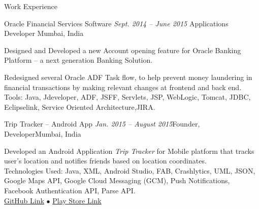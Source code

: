 \documentclass{resume} %
\begin{document}

\begin{rSection}{Work Experience}

\begin{rSubsection}{Oracle Financial Services Software} {\emph{Sept. 2014 -- June 2015}} {Applications Developer}
{Mumbai, India}

\item Designed and Developed a new Account opening feature for Oracle Banking Platform -- a next generation Banking Solution.
\item Redesigned several Oracle ADF Task flow, to help prevent money laundering in financial transactions by making relevant changes at frontend and back end.
Tools: Java, Jdeveloper, ADF, JSFF, Servlets, JSP, WebLogic, Tomcat, JDBC, Eclipselink, Service Oriented Architecture,JIRA.

\end{rSubsection}


\begin{rSubsection}{Trip Tracker -- Android App}{\emph{ Jan. 2015 -- August 2015}}{Founder, Developer}{Mumbai, India}
\item Developed an Android Application {\emph{Trip Tracker}}  for Mobile platform that tracks user's  location and notifies friends based on location coordinates. \\
Technologies Used: Java, XML, Android Studio, FAB, Crashlytics, UML, JSON, Google Maps API, Google Cloud Messaging (GCM), Push Notifications, Facebook Authentication API, Parse API. \\
\href{https://github.com/sahil2441/Trip-Tracker}{GitHub Link}
{\tiny$\bullet$}
\href{https://play.google.com/store/apps/details?id=me.sahiljain.tripTracker}{Play Store Link}
\end{rSubsection}

\end{rSection}
\end{document}
